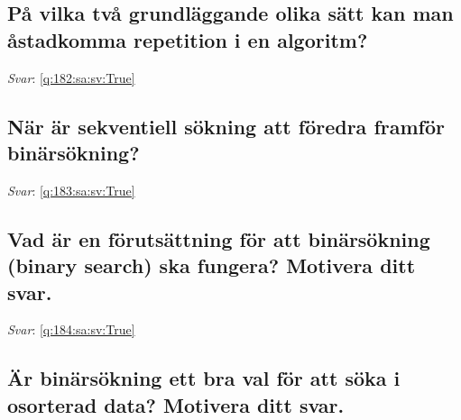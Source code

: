 \documentclass[a4paper,11pt,oneside]{article}
\begin{document}
\begin{sloppypar}
\subsection{P\r{a} vilka tv\r{a} grundl\"aggande olika s\"att kan man \r{a}stadkomma repetition i en algoritm?}

\label{q:182:sa:sv:False}

\vspace{2cm}

\noindent\makebox[\textwidth]{\hrulefill}

\vspace{1cm}

\textit{Svar}: \autoref{q:182:sa:sv:True}



\subsection{N\"ar \"ar sekventiell s\"okning att f\"oredra framf\"or bin\"ars\"okning?}

\label{q:183:sa:sv:False}

\vspace{2cm}

\noindent\makebox[\textwidth]{\hrulefill}

\vspace{1cm}

\textit{Svar}: \autoref{q:183:sa:sv:True}



\subsection{Vad \"ar en f\"oruts\"attning f\"or att bin\"ars\"okning (binary search) ska fungera? Motivera ditt svar.}

\label{q:184:sa:sv:False}

\vspace{2cm}

\noindent\makebox[\textwidth]{\hrulefill}

\vspace{1cm}

\textit{Svar}: \autoref{q:184:sa:sv:True}



\subsection{\"Ar bin\"ars\"okning ett bra val f\"or att s\"oka i osorterad data? Motivera ditt svar.}


\end{sloppypar}
\end{document}
